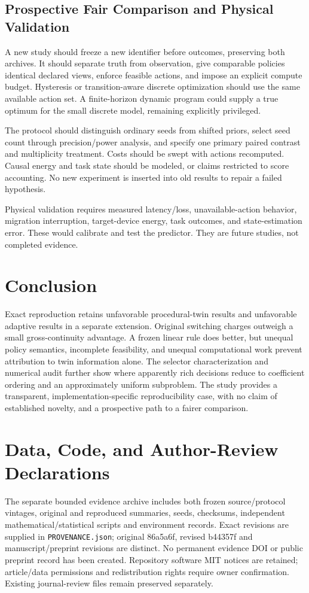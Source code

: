 \documentclass[10pt,twocolumn]{article}
\begin{document}
\subsection{Prospective Fair Comparison and Physical Validation}
A new study should freeze a new identifier before outcomes, preserving both archives. It should separate truth from observation, give comparable policies identical declared views, enforce feasible actions, and impose an explicit compute budget. Hysteresis or transition-aware discrete optimization should use the same available action set. A finite-horizon dynamic program could supply a true optimum for the small discrete model, remaining explicitly privileged.

The protocol should distinguish ordinary seeds from shifted priors, select seed count through precision/power analysis, and specify one primary paired contrast and multiplicity treatment. Costs should be swept with actions recomputed. Causal energy and task state should be modeled, or claims restricted to score accounting. No new experiment is inserted into old results to repair a failed hypothesis.

Physical validation requires measured latency/loss, unavailable-action behavior, migration interruption, target-device energy, task outcomes, and state-estimation error. These would calibrate and test the predictor. They are future studies, not completed evidence.

\section{Conclusion}
Exact reproduction retains unfavorable procedural-twin results and unfavorable adaptive results in a separate extension. Original switching charges outweigh a small gross-continuity advantage. A frozen linear rule does better, but unequal policy semantics, incomplete feasibility, and unequal computational work prevent attribution to twin information alone. The selector characterization and numerical audit further show where apparently rich decisions reduce to coefficient ordering and an approximately uniform subproblem. The study provides a transparent, implementation-specific reproducibility case, with no claim of established novelty, and a prospective path to a fairer comparison.


\section*{Data, Code, and Author-Review Declarations}
The separate bounded evidence archive includes both frozen source/protocol vintages, original and reproduced summaries, seeds, checksums, independent mathematical/statistical scripts and environment records. Exact revisions are supplied in \texttt{PROVENANCE.json}; original 86a5a6f, revised b44357f and manuscript/preprint revisions are distinct. No permanent evidence DOI or public preprint record has been created. Repository software MIT notices are retained; article/data permissions and redistribution rights require owner confirmation. Existing journal-review files remain preserved separately.
\end{document}
